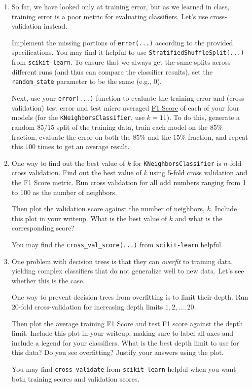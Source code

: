 \begin{enumerate}
\item {} So far, we have looked only at training error, but as we learned in class, training error is a poor metric for evaluating classifiers. Let's use cross-validation instead.

Implement the missing portions of \verb|error(...)| according to the provided specifications. You may find it helpful to use \verb|StratifiedShuffleSplit(...)| from \verb|scikit-learn|. To ensure that we always get the same splits across different runs (and thus can compare the classifier results), set the \verb|random_state| parameter to be the same (e.g., 0).


Next, use your \verb|error(...)| function to evaluate the training error and (cross-validation) test error and test micro averaged \href{https://scikit-learn.org/stable/modules/generated/sklearn.metrics.f1_score.html?highlight=f1\%20score#sklearn.metrics.f1_score}{F1 Score} of each of your four models (for the \verb|KNeighborsClassifier|, use $k=11$). To do this, generate a random $85/15$ split of the training data, train each model on the $85\%$ fraction, evaluate the error on both the $85\%$ and the $15\%$ fraction, and repeat this $100$ times to get an average result.


\item {} One way to find out the best value of $k$ for \verb|KNeighborsClassifier| is $n$-fold cross validation.
Find out the best value of $k$ using 5-fold cross validation and the F1 Score metric. Run cross validation for all odd numbers ranging from 1 to 100 as the number of neighbors.

Then plot the validation score against the number of neighbors, $k$. Include this plot in your writeup. What is the best value of $k$ and what is the corresponding score?

You may find the \verb|cross_val_score(...)| from \verb|scikit-learn| helpful. 



\item {} One problem with decision trees is that they can \emph{overfit} to training data, yielding complex classifiers that do not generalize well to new data. Let's see whether this is the case.

One way to prevent decision trees from overfitting is to limit their depth. Run 20-fold cross-validation for increasing depth limits $1,2,\ldots,20$. 

Then plot the average training F1 Score and test F1 score against the depth limit. Include this plot in your writeup, making sure to label all axes and include a legend for your classifiers. What is the best depth limit to use for this data? Do you see overfitting? Justify your answers using the plot.

You may find \verb|cross_validate| from \verb|scikit-learn| helpful when you want both training scores and validation scores.

\end{enumerate}
